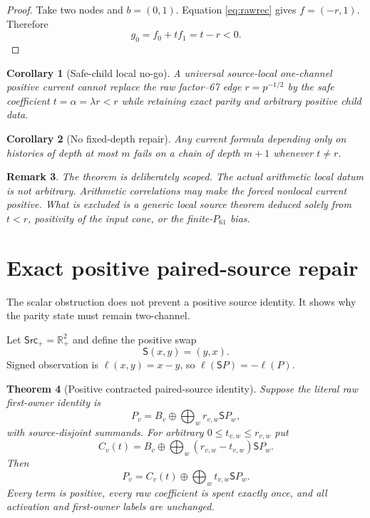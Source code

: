 \documentclass[11pt]{article}
\newtheorem{theorem}{Theorem}[section]
\newtheorem{corollary}[theorem]{Corollary}
\newtheorem{remark}[theorem]{Remark}
\newcommand{\R}{\mathbb R}
\newcommand{\1}{\mathbf 1}
\newcommand{\Src}{\mathsf{Src}}
\begin{document}
\begin{proof}
Take two nodes and $b=(0,1)$.  Equation \eqref{eq:rawrec} gives
$f=(-r,1)$.  Therefore
\[
 g_0=f_0+tf_1=t-r<0.
\]
\end{proof}

\begin{corollary}[Safe-child local no-go]
A universal source-local one-channel positive current cannot replace the raw
factor--67 edge $r=p^{-1/2}$ by the safe coefficient
$t=\alpha=\lambda r<r$ while retaining exact parity and arbitrary positive
child data.
\end{corollary}

\begin{corollary}[No fixed-depth repair]
Any current formula depending only on histories of depth at most $m$ fails on a
chain of depth $m+1$ whenever $t\ne r$.
\end{corollary}

\begin{remark}
The theorem is deliberately scoped.  The actual arithmetic local datum is not
arbitrary.  Arithmetic correlations may make the forced nonlocal current
positive.  What is excluded is a generic local source theorem deduced solely
from $t<r$, positivity of the input cone, or the finite-$P_{61}$ bias.
\end{remark}

\section{Exact positive paired-source repair}

The scalar obstruction does not prevent a positive source identity.  It shows
why the parity state must remain two-channel.

Let $\Src_+=\R_+^2$ and define the positive swap
\[
 \mathsf S(x,y)=(y,x).
\]
Signed observation is $\ell(x,y)=x-y$, so
$\ell(\mathsf SP)=-\ell(P)$.

\begin{theorem}[Positive contracted paired-source identity]
\label{thm:paired}
Suppose the literal raw first-owner identity is
\begin{equation}
 P_v=B_v\oplus\bigoplus_w r_{v,w}\mathsf SP_w,
 \label{eq:rawsource}
\end{equation}
with source-disjoint summands.  For arbitrary
$0\le t_{v,w}\le r_{v,w}$ put
\begin{equation}
 C_v(t)=B_v\oplus\bigoplus_w(r_{v,w}-t_{v,w})\mathsf SP_w.
 \label{eq:currentpacket}
\end{equation}
Then
\begin{equation}
 \boxed{
 P_v=C_v(t)\oplus\bigoplus_wt_{v,w}\mathsf SP_w.
 }
 \label{eq:contractedsource}
\end{equation}
Every term is positive, every raw coefficient is spent exactly once, and all
activation and first-owner labels are unchanged.
\end{theorem}
\end{document}
